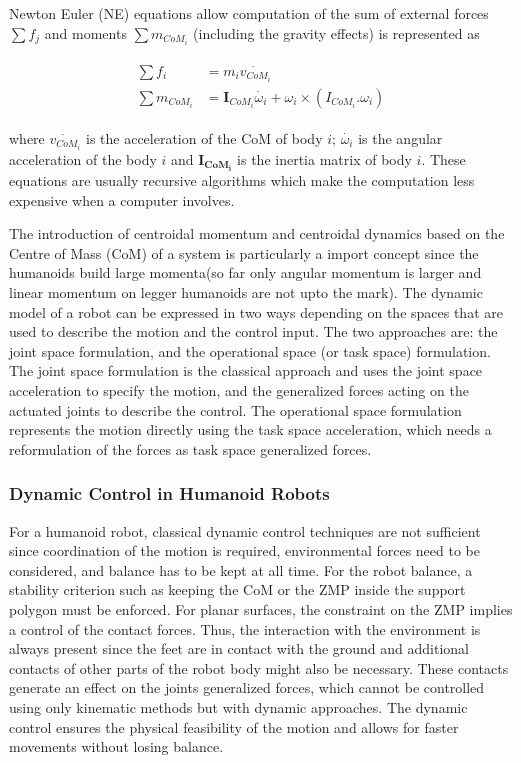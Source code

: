 \begin{enumerate}
    Newton Euler (NE) equations allow computation of the sum of external forces $\sum f_j$ and moments $\sum m_{CoM_i}$ (including the gravity effects) is represented as

    \begin{align}
        \begin{split}
            \sum f_i &= m_i\dot{v_{CoM_i}} \\
            \sum m_{CoM_i} &= \mathbf{I}_{CoM_i}\dot{\omega_i} + \omega_i \times (I_{CoM_i}.\omega_i)
        \end{split}
        \label{eq: NE}
    \end{align}

    where $\dot{v_{CoM_i}}$ is the acceleration of the CoM of body $i$; $\dot{\omega_i}$ is the angular acceleration of the body $i$ and $\mathbf{I_{CoM_i}}$ is the inertia matrix of body $i$.
    These equations are usually recursive algorithms \cite{featherstone2014rigid,featherstone2000robot} which make the computation less expensive when a computer involves.

\end{enumerate}

The introduction of centroidal momentum and centroidal dynamics based on the Centre of Mass (CoM) of a system is particularly a import concept since the humanoids build large momenta(so far only
angular momentum is larger and linear momentum on legger humanoids are not upto the mark). The dynamic model of a robot can be expressed in two ways depending on the spaces that are used to describe the motion and the control input. The two approaches are: the joint space formulation, and the operational space 
(or task space) formulation. The joint space formulation is the classical approach and uses the joint space acceleration to specify the motion, and the generalized forces acting on the actuated joints 
to describe the control. The operational space formulation represents the motion directly using the task space acceleration, which needs a reformulation of the forces as task space generalized 
forces.

\subsubsection{Dynamic Control in Humanoid Robots}

For a humanoid robot, classical dynamic control techniques are not sufficient since coordination of the motion is required, environmental forces need to be considered, and balance has to be kept at all 
time. For the robot balance, a stability criterion such as keeping the CoM or the ZMP inside the support polygon must be enforced. For planar surfaces, the constraint on the 
ZMP implies a control of the contact forces. Thus, the interaction with the environment is always present since the feet are in contact with the ground and additional contacts of other parts of the robot 
body might also be necessary. These contacts generate an effect on the joints generalized forces, which cannot be controlled using only kinematic methods but with dynamic approaches. The dynamic control 
ensures the physical feasibility of the motion and allows for faster movements without losing balance.

